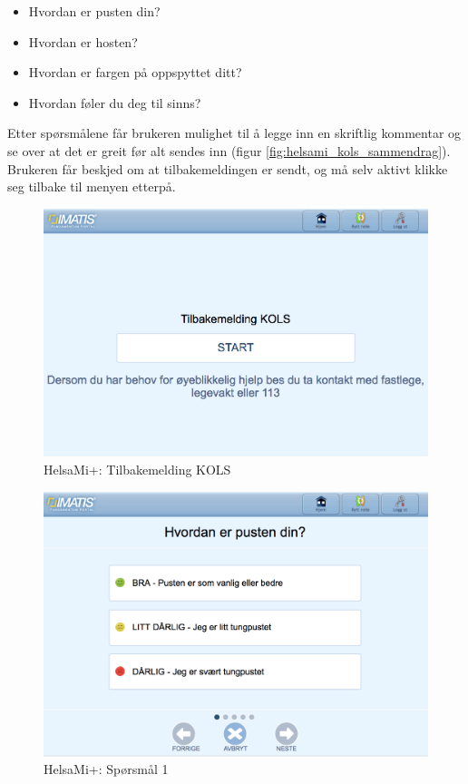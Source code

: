 \begin{itemize}
  \tightlist
  \item Hvordan er pusten din?
  \item Hvordan er hosten?
  \item Hvordan er fargen på oppspyttet ditt?
  \item Hvordan føler du deg til sinns?
\end{itemize}

Etter spørsmålene får brukeren mulighet til å legge inn en skriftlig kommentar og se over at det er greit
før alt sendes inn (figur \ref{fig:helsami_kols_sammendrag}). Brukeren får beskjed om at tilbakemeldingen er sendt,
og må selv aktivt klikke seg tilbake til menyen etterpå.

\begin{figure}
\includegraphics[width=1.0\textwidth,center]{fig/helsami/kols_start}
\caption{HelsaMi+: Tilbakemelding KOLS}
\label{fig:helsami_kols_start}
\end{figure}

\begin{figure}
\includegraphics[width=1.0\textwidth,center]{fig/helsami/kols_sp1}
\caption{HelsaMi+: Spørsmål 1}
\label{fig:helsami_kols_sp1}
\end{figure}

